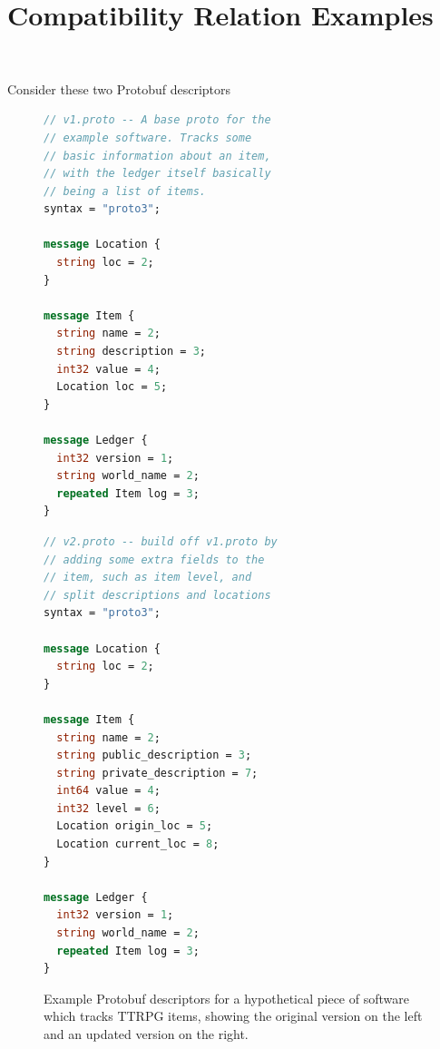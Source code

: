 \section{Compatibility Relation Examples}~\label{sec:comp-ex}

Consider these two Protobuf descriptors

\begin{figure}[H]
	\centering
	\begin{minipage}[bt]{0.43\textwidth}
		\begin{lstlisting}[language=proto]
// v1.proto -- A base proto for the
// example software. Tracks some
// basic information about an item,
// with the ledger itself basically
// being a list of items.
syntax = "proto3";

message Location {
  string loc = 2;
}

message Item {
  string name = 2;
  string description = 3;
  int32 value = 4;
  Location loc = 5;
}

message Ledger {
  int32 version = 1;
  string world_name = 2;
  repeated Item log = 3;
}\end{lstlisting}
	\end{minipage}
	\hspace{0.5cm}
	\begin{minipage}[bt]{0.48\textwidth}
		\begin{lstlisting}[language=proto]
// v2.proto -- build off v1.proto by
// adding some extra fields to the
// item, such as item level, and
// split descriptions and locations
syntax = "proto3";

message Location {
  string loc = 2;
}

message Item {
  string name = 2;
  string public_description = 3;
  string private_description = 7;
  int64 value = 4;
  int32 level = 6;
  Location origin_loc = 5;
  Location current_loc = 8;
}

message Ledger {
  int32 version = 1;
  string world_name = 2;
  repeated Item log = 3;
}\end{lstlisting}
	\end{minipage}

	\caption{Example Protobuf descriptors for a hypothetical piece of software
      which tracks TTRPG items, showing the original version on the left and an
      updated version on the right.}
	\label{fig:proto-ex}
\end{figure}

